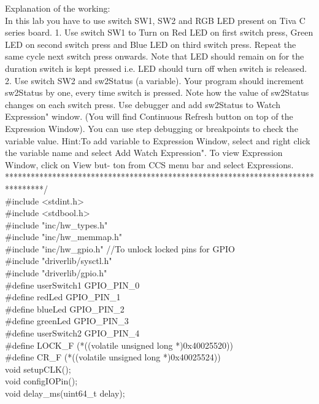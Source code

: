 \documentclass[a4paper,10pt,oneside]{article}
\begin{document}
{		Explanation of the working:\\
		In this lab you have to use switch SW1, SW2 and RGB LED present on Tiva C series board.
		1. Use switch SW1 to Turn on Red LED on first switch press, Green LED on second
		switch press and Blue LED on third switch press. Repeat the same cycle next switch
		press onwards. Note that LED should remain on for the duration switch is kept pressed
		i.e. LED should turn off when switch is released.\\
		2. Use switch SW2 and sw2Status (a variable). Your program should increment sw2Status
		by one, every time switch is pressed. Note how the value of sw2Status changes on each
		switch press. Use debugger and add sw2Status to  Watch Expression" window.
		(You will find Continuous Refresh button on top of the Expression Window). You can
		use step debugging or breakpoints to check the variable value.
		Hint:To add variable to Expression Window, select and right click the variable name
		and select  Add Watch Expression". To view Expression Window, click on View but-
		ton from CCS menu bar and select Expressions.\\
		*********************************************************************************/\\
		\#include <stdint.h>\\
		\#include <stdbool.h>\\
		\#include "inc/hw\_types.h"\\
		\#include "inc/hw\_memmap.h"\\
		\#include "inc/hw\_gpio.h" //To unlock locked pins for GPIO\\
		\#include "driverlib/sysctl.h"\\
		\#include "driverlib/gpio.h"\\
		\#define userSwitch1 GPIO\_PIN\_0\\
		\#define redLed      GPIO\_PIN\_1\\
		\#define blueLed     GPIO\_PIN\_2\\
		\#define greenLed    GPIO\_PIN\_3\\
		\#define userSwitch2 GPIO\_PIN\_4\\
		\#define LOCK\_F (*((volatile unsigned long *)0x40025520))\\
		\#define CR\_F   (*((volatile unsigned long *)0x40025524))\\
		void setupCLK();\\
		void configIOPin();\\
		void delay\_ms(uint64\_t delay);\\
}
\end{document}

